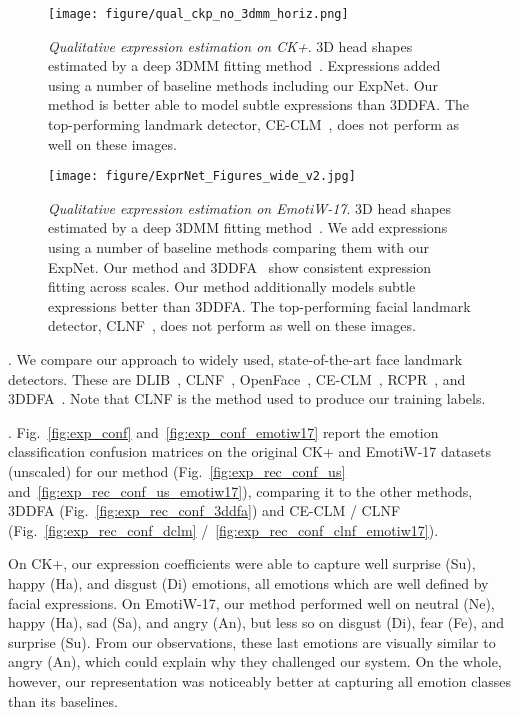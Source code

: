 \documentclass[a4paper, 10pt, conference]{ieeeconf}
\newcommand{\minisection}[1]{\vspace{2mm}\noindent{\bf #1}.}
\begin{document}
\begin{figure*}[tb]
\centering
\texttt{[image: figure/qual\_ckp\_no\_3dmm\_horiz.png]}
\caption{
{\em Qualitative expression estimation on CK+}. 3D head shapes estimated by a deep 3DMM fitting method~\cite{tran16_3dmm_cnn}. Expressions added using a number of baseline methods including our ExpNet. Our method is better able to model subtle expressions than 3DDFA. The top-performing landmark detector, CE-CLM~\cite{zadeh2016deep}, does not perform as well on these images.}
\label{fig:qual}
\vspace{-3mm}
\end{figure*}

\begin{figure*}[tb]
\centering
\texttt{[image: figure/ExprNet\_Figures\_wide\_v2.jpg]}
\caption{
{\em Qualitative expression estimation on EmotiW-17}. 3D head shapes estimated by a deep 3DMM fitting method~\cite{tran16_3dmm_cnn}. We add expressions using a number of baseline methods comparing them with our ExpNet. Our method and 3DDFA~\cite{zhu2015} show consistent expression fitting across scales. Our method additionally models subtle expressions better than 3DDFA. The top-performing facial landmark detector, CLNF~\cite{baltrusaitis2013constrained}, does not perform as well on these images.}
\label{fig:qual_emotiw17}
\vspace{-3mm}
\end{figure*}



\minisection{Baseline methods} We compare our approach to widely used, state-of-the-art face landmark detectors. These are DLIB~\cite{king2009dlib}, CLNF~\cite{baltrusaitis2013constrained}, OpenFace~\cite{baltruvsaitis2016openface}, CE-CLM~\cite{zadeh2016deep}, RCPR~\cite{burgos2013robust}, and 3DDFA~\cite{zhu2015}. Note that CLNF is the method used to produce our training labels. 
 
\minisection{Results} Fig.~\ref{fig:exp_conf} and~\ref{fig:exp_conf_emotiw17} report the emotion classification confusion matrices on the original CK+ and EmotiW-17 datasets (unscaled) for our method (Fig.~\ref{fig:exp_rec_conf_us} and~\ref{fig:exp_rec_conf_us_emotiw17}), comparing it to the other methods, 3DDFA (Fig.~\ref{fig:exp_rec_conf_3ddfa}) and CE-CLM / CLNF (Fig.~\ref{fig:exp_rec_conf_dclm} /~\ref{fig:exp_rec_conf_clnf_emotiw17}). 

On CK+, our expression coefficients were able to capture well surprise (Su), happy (Ha), and disgust (Di) emotions, all emotions which are well defined by facial expressions. On EmotiW-17, our method performed well on neutral (Ne), happy (Ha), sad (Sa), and angry (An), but less so on disgust (Di), fear (Fe), and surprise (Su). From our observations, these last emotions are visually similar to angry (An), which could explain why they challenged our system. On the whole, however, our representation was noticeably better at capturing all emotion classes than its baselines. 
\end{document}
